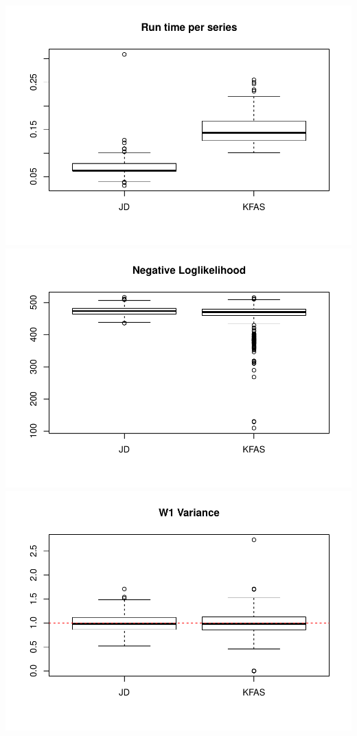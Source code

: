\documentclass[]{article}
\begin{document}
\includegraphics{simulation_test_files/figure-latex/simulate_sae-2.pdf}
\includegraphics{simulation_test_files/figure-latex/simulate_sae-3.pdf}
\includegraphics{simulation_test_files/figure-latex/simulate_sae-4.pdf}
\end{document}
